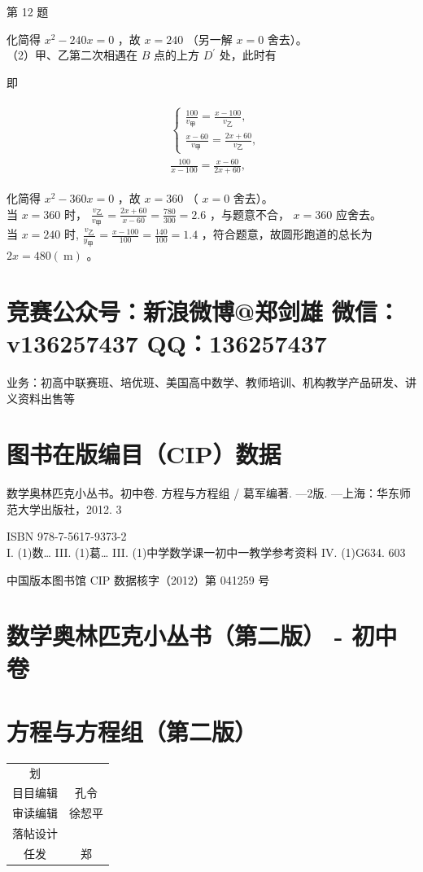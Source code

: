 \documentclass[10pt]{article}
\begin{document}
第 12 题

化简得 $x^{2}-240 x=0$ ，故 $x=240$ （另一解 $x=0$ 舍去）。\\
（2）甲、乙第二次相遇在 $B$ 点的上方 $D^{\prime}$ 处，此时有

即

\begin{align*}
\begin{aligned}
& \left\{\begin{array}{l}
\frac{100}{v_{\text {甲 }}}=\frac{x-100}{v_{乙}}, \\
\frac{x-60}{v_{\text {甲 }}}=\frac{2 x+60}{v_{乙}},
\end{array}\right. \\
& \frac{100}{x-100}=\frac{x-60}{2 x+60},
\end{aligned}
\end{align*}

化简得 $x^{2}-360 x=0$ ，故 $x=360$ （ $x=0$ 舍去）。\\
当 $x=360$ 时， $\frac{v_{乙}}{v_{\text {甲 }}}=\frac{2 x+60}{x-60}=\frac{780}{300}=2.6$ ，与题意不合， $x=360$ 应舍去。\\
当 $x=240$ 时, $\frac{v_{乙}}{y_{\text {甲 }}}=\frac{x-100}{100}=\frac{140}{100}=1.4$ ，符合题意，故圆形跑道的总长为 $2 x=480(\mathrm{~m})$ 。

\section*{竞赛公众号：新浪微博@郑剑雄 微信：v136257437 QQ：136257437}
业务：初高中联赛班、培优班、美国高中数学、教师培训、机构教学产品研发、讲义资料出售等

\section*{图书在版编目（CIP）数据}
数学奥林匹克小丛书。初中卷. 方程与方程组 / 葛军编著. —2版. —上海：华东师范大学出版社，2012. 3

ISBN 978-7-5617-9373-2\\
I. (1)数… III. (1)葛… III. (1)中学数学课一初中一教学参考资料 IV. (1)G634. 603

中国版本图书馆 CIP 数据核字（2012）第 041259 号

\section*{数学奥林匹克小丛书（第二版） - 初中卷}
\section*{方程与方程组（第二版）}
\begin{center}
\begin{tabular}{|c|c|}
\hline
 &  \\
\hline
划 &  \\
\hline
目目编辑 & 孔令 \\
\hline
审读编辑 & 徐恝平 \\
\hline
落帖设计 &  \\
\hline
任发 & 郑 \\
\hline
\end{tabular}
\end{center}
\end{document}
